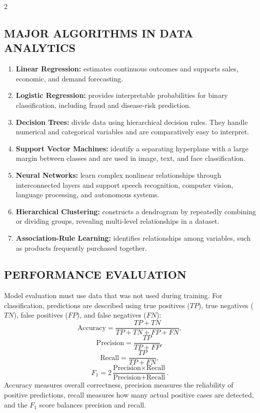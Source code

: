 \begin{multicols}{2}
  \subsection*{\centering\uppercase{Major Algorithms in Data Analytics}}
  \begin{enumerate}\justifying
    \item \textbf{Linear Regression:} estimates continuous outcomes and supports sales, economic, and demand forecasting.
    \item \textbf{Logistic Regression:} provides interpretable probabilities for binary classification, including fraud and disease-risk prediction.
    \item \textbf{Decision Trees:} divide data using hierarchical decision rules. They handle numerical and categorical variables and are comparatively easy to interpret.
    \item \textbf{Support Vector Machines:} identify a separating hyperplane with a large margin between classes and are used in image, text, and face classification.
    \item \textbf{Neural Networks:} learn complex nonlinear relationships through interconnected layers and support speech recognition, computer vision, language processing, and autonomous systems.
    \item \textbf{Hierarchical Clustering:} constructs a dendrogram by repeatedly combining or dividing groups, revealing multi-level relationships in a dataset.
    \item \textbf{Association-Rule Learning:} identifies relationships among variables, such as products frequently purchased together.
  \end{enumerate}

  \subsection*{\centering\uppercase{Performance Evaluation}}
  Model evaluation must use data that was not used during training. For classification, predictions are described using true positives ($TP$), true negatives ($TN$), false positives ($FP$), and false negatives ($FN$):
  \[
    \text{Accuracy}=\frac{TP+TN}{TP+TN+FP+FN},
  \]
  \[
    \text{Precision}=\frac{TP}{TP+FP},
  \]
  \[
    \text{Recall}=\frac{TP}{TP+FN},
  \]
  \[
    F_1=2\frac{\text{Precision}\times\text{Recall}}
    {\text{Precision}+\text{Recall}}.
  \]
  Accuracy measures overall correctness, precision measures the reliability of positive predictions, recall measures how many actual positive cases are detected, and the $F_1$ score balances precision and recall.


\end{multicols}
